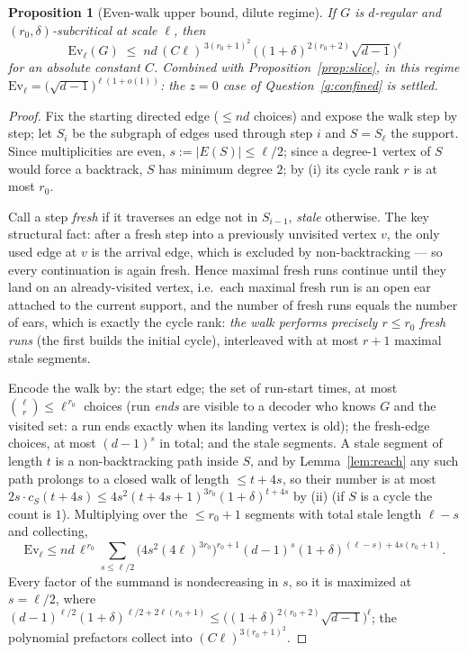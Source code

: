 \documentclass[11pt]{article}
\newtheorem{proposition}[lemma]{Proposition}
\theoremstyle{remark}
\begin{document}
\begin{proposition}[Even-walk upper bound, dilute regime]\label{prop:upper}
If $G$ is $d$-regular and $(r_0,\delta)$-subcritical at scale $\ell$,
then
\[
\mathrm{Ev}_\ell(G)\;\le\;
nd\,(C\ell)^{\,3(r_0+1)^2}\,
\Big((1+\delta)^{2(r_0+2)}\sqrt{d-1}\Big)^{\ell}
\]
for an absolute constant $C$. Combined with
Proposition~\ref{prop:slice}, in this regime
$\mathrm{Ev}_\ell=\big(\sqrt{d-1}\big)^{\ell(1+o(1))}$: the $z=0$ case
of Question~\ref{q:confined} is settled.
\end{proposition}

\begin{proof}
Fix the starting directed edge ($\le nd$ choices) and expose the walk
step by step; let $S_i$ be the subgraph of edges used through step $i$
and $S=S_{\ell}$ the support. Since multiplicities are even,
$s:=|E(S)|\le\ell/2$; since a degree-$1$ vertex of $S$ would force a
backtrack, $S$ has minimum degree $2$; by (i) its cycle rank $r$ is at
most $r_0$.

Call a step \emph{fresh} if it traverses an edge not in $S_{i-1}$,
\emph{stale} otherwise. The key structural fact: after a fresh step
into a previously unvisited vertex $v$, the only used edge at $v$ is
the arrival edge, which is excluded by non-backtracking --- so every
continuation is again fresh. Hence maximal fresh runs continue until
they land on an already-visited vertex, i.e.\ each maximal fresh run is
an open ear attached to the current support, and the number of fresh
runs equals the number of ears, which is exactly the cycle rank:
\emph{the walk performs precisely $r\le r_0$ fresh runs} (the first
builds the initial cycle), interleaved with at most $r+1$ maximal stale
segments.

Encode the walk by: the start edge; the set of run-start times, at most
$\binom{\ell}{r}\le\ell^{\,r_0}$ choices (run \emph{ends} are visible
to a decoder who knows $G$ and the visited set: a run ends exactly when
its landing vertex is old); the fresh-edge choices, at most $(d-1)^{s}$
in total; and the stale segments. A stale segment of length $t$ is a
non-backtracking path inside $S$, and by Lemma~\ref{lem:reach} any such
path prolongs to a closed walk of length $\le t+4s$, so their number is
at most $2s\cdot c_S(t+4s)\le 4s^2(t+4s+1)^{3r_0}(1+\delta)^{t+4s}$ by
(ii) (if $S$ is a cycle the count is $1$). Multiplying over the
$\le r_0+1$ segments with total stale length $\ell-s$ and collecting,
\[
\mathrm{Ev}_\ell\le nd\,\ell^{\,r_0}\!\!\sum_{s\le\ell/2}\!
\big(4s^2(4\ell)^{3r_0}\big)^{r_0+1}
(d-1)^{s}(1+\delta)^{(\ell-s)+4s(r_0+1)} .
\]
Every factor of the summand is nondecreasing in $s$, so it is maximized
at $s=\ell/2$, where
$(d-1)^{\ell/2}(1+\delta)^{\ell/2+2\ell(r_0+1)}\le
\big((1+\delta)^{2(r_0+2)}\sqrt{d-1}\big)^{\ell}$; the polynomial
prefactors collect into $(C\ell)^{3(r_0+1)^2}$.
\end{proof}
\end{document}
